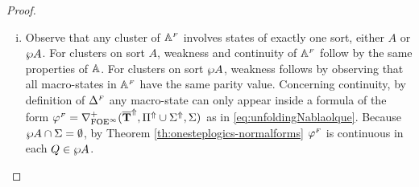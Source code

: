 \begin{proof}
\begin{enumerate}[(i)]
\item
Observe that any cluster of $\mathbb{A}^{{\scriptscriptstyle F}}$ involves states of exactly one sort,
either $A$ or $\wp A$.
For clusters on sort $A$, weakness and continuity of $\mathbb{A}^{{\scriptscriptstyle F}}$ follow by 
the same properties of $\mathbb{A}$.
For clusters on sort $\wp A$, weakness follows by observing that all macro-states in
$\mathbb{A}^{{\scriptscriptstyle F}}$ have the same parity value.
Concerning continuity, by definition of $\Delta^{{\scriptscriptstyle F}}$ any macro-state can only
appear inside a formula of the form $\varphi^{{\scriptscriptstyle F}} =
\nabla^+_{\mathrm{FOE}^{\infty}}(\overline{{\mathbf{T}}}^{\Uparrow},\Pi^{\Uparrow} \cup \Sigma^{\Uparrow},\Sigma)$ as in \eqref{eq:unfoldingNablaolque}. Because $\wp A \cap \Sigma = \emptyset$, by Theorem \ref{th:onesteplogics-normalforms} $\varphi^{{\scriptscriptstyle F}}$ is continuous in each $Q \in \wp A$.


\end{enumerate}
\end{proof}

